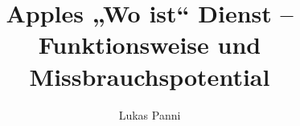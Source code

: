 \documentclass[runningheads]{llncs}
\begin{document}
\title{Apples „Wo ist“ Dienst – Funktionsweise und Missbrauchspotential}


\author{Lukas Panni}


\maketitle              %

\begin{abstract}
\end{abstract}











\end{document}
